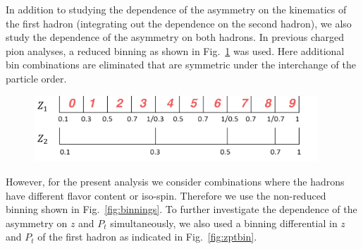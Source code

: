 In addition to studying the dependence of the asymmetry on the kinematics of the first hadron (integrating out the dependence on the second hadron),  we also study the dependence of the asymmetry on both hadrons. 
In previous charged pion analyses, a reduced binning  as shown in Fig.~\ref{fig:comz_mark} was used. Here additional bin combinations are eliminated that are symmetric under the interchange of the particle order.
\begin{figure}[H]
\centering
\begin{minipage}{.5\textwidth}
  \centering
  \includegraphics[width=0.95\textwidth,natwidth=610,natheight=642]{figure_dataselection/zbin.pdf}
  \label{fig:comz_mark}
\end{minipage}%
\end{figure}
However, for the present analysis we consider combinations where the hadrons have different flavor content or iso-spin. 
Therefore we use the non-reduced  binning shown in Fig.~\ref{fig:binnings}. To further investigate the dependence of the asymmetry on $z$ and $P_t$ simultaneously, we also used a binning differential in $z$ and $P_t$ of the first hadron as indicated in Fig.~\ref{fig:zptbin}.   
